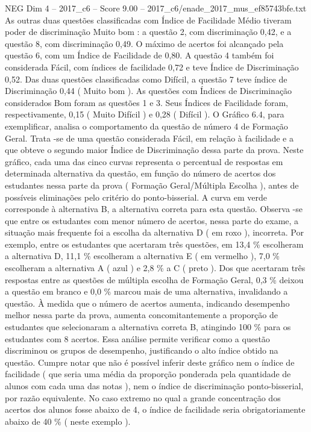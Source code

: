 \begin{textsample}{NEG Dim 4 – 2017\_c6 – Score 9.00 – 2017\_c6/enade\_2017\_mus\_ef85743bfe.txt}
As outras duas questões classificadas com Índice de Facilidade Médio tiveram poder de discriminação Muito bom : a questão 2, com discriminação 0,42, e a questão 8, com discriminação 0,49.
O máximo de acertos foi alcançado pela questão 6, com um Índice de Facilidade de 0,80.
A questão 4 também foi considerada Fácil, com índices de facilidade 0,72 e teve Índice de Discriminação 0,52.
Das duas questões classificadas como Difícil, a questão 7 teve índice de Discriminação 0,44 ( Muito bom ).
As questões com Índices de Discriminação considerados Bom foram as questões 1 e 3.
Seus Índices de Facilidade foram, respectivamente, 0,15 ( Muito Difícil ) e 0,28 ( Difícil ).
O Gráfico 6.4, para exemplificar, analisa o comportamento da questão de número 4 de Formação Geral.
Trata -se de uma questão considerada Fácil, em relação à facilidade e a que obteve o segundo maior Índice de Discriminação dessa parte da prova.
Neste gráfico, cada uma das cinco curvas representa o percentual de respostas em determinada alternativa da questão, em função do número de acertos dos estudantes nessa parte da prova ( Formação Geral/Múltipla Escolha ), antes de possíveis eliminações pelo critério do ponto-bisserial.
A curva em verde corresponde à alternativa B, a alternativa correta para esta questão.
Observa -se que entre os estudantes com menor número de acertos, nessa parte do exame, a situação mais frequente foi a escolha da alternativa D ( em roxo ), incorreta.
Por exemplo, entre os estudantes que acertaram três questões, em 13,4 \% escolheram a alternativa D, 11,1 \% escolheram a alternativa E ( em vermelho ), 7,0 \% escolheram a alternativa A ( azul ) e 2,8 \% a C ( preto ).
Dos que acertaram três respostas entre as questões de múltipla escolha de Formação Geral, 0,3 \% deixou a questão em branco e 0,0 \% marcou mais de uma alternativa, invalidando a questão.
À medida que o número de acertos aumenta, indicando desempenho melhor nessa parte da prova, aumenta concomitantemente a proporção de estudantes que selecionaram a alternativa correta B, atingindo 100 \% para os estudantes com 8 acertos.
Essa análise permite verificar como a questão discriminou os grupos de desempenho, justificando o alto índice obtido na questão.
Cumpre notar que não é possível inferir deste gráfico nem o índice de facilidade ( que seria uma média da proporção ponderada pela quantidade de alunos com cada uma das notas ), nem o índice de discriminação ponto-bisserial, por razão equivalente.
No caso extremo no qual a grande concentração dos acertos dos alunos fosse abaixo de 4, o índice de facilidade seria obrigatoriamente abaixo de 40 \% ( neste exemplo ).

\end{textsample}
